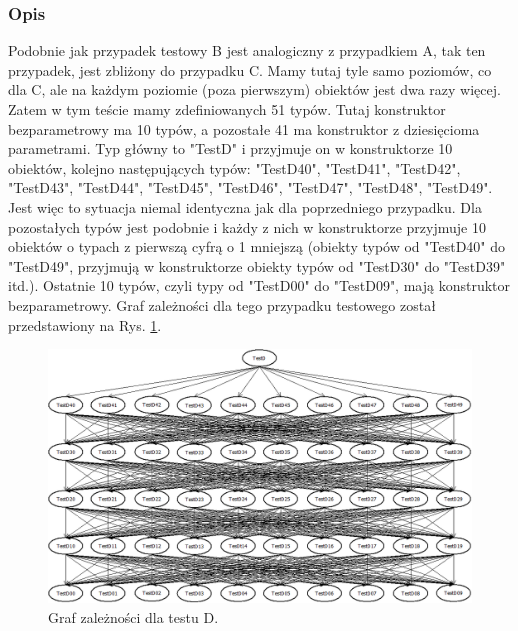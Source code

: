 \documentclass[12pt]{article}
\begin{document}
\subsubsection{Opis}
Podobnie jak przypadek testowy B jest analogiczny z przypadkiem A, tak ten przypadek, jest zbliżony do przypadku C. Mamy tutaj tyle samo poziomów, co dla C, ale na każdym poziomie (poza pierwszym) obiektów jest dwa razy więcej. Zatem w tym teście mamy zdefiniowanych 51 typów. Tutaj konstruktor bezparametrowy ma 10 typów, a pozostałe 41 ma konstruktor z dziesięcioma parametrami. Typ główny to "TestD" i przyjmuje on w konstruktorze 10 obiektów, kolejno następujących typów: "TestD40", "TestD41", "TestD42", "TestD43", "TestD44", "TestD45", "TestD46", "TestD47", "TestD48", "TestD49". Jest więc to sytuacja niemal identyczna jak dla poprzedniego przypadku. Dla pozostałych typów jest podobnie i każdy z nich w konstruktorze przyjmuje 10 obiektów o typach z pierwszą cyfrą o 1 mniejszą (obiekty typów od "TestD40" do "TestD49", przyjmują w konstruktorze obiekty typów od "TestD30" do "TestD39" itd.). Ostatnie 10 typów, czyli typy od "TestD00" do "TestD09", mają konstruktor bezparametrowy. Graf zależności dla tego przypadku testowego został przedstawiony na Rys. \ref{fig:testD}.\\
\begin{figure}[H]
	\begin{center}
  		\includegraphics[width=\linewidth]{TestD.png}
  		\caption{Graf zależności dla testu D.}
  		\label{fig:testD}
	\end{center}
\end{figure}
\end{document}
